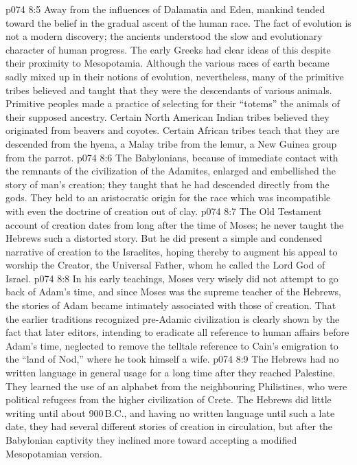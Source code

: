 \vs p074 8:5 Away from the influences of Dalamatia and Eden, mankind tended toward the belief in the gradual ascent of the human race. The fact of evolution is not a modern discovery; the ancients understood the slow and evolutionary character of human progress. The early Greeks had clear ideas of this despite their proximity to Mesopotamia. Although the various races of earth became sadly mixed up in their notions of evolution, nevertheless, many of the primitive tribes believed and taught that they were the descendants of various animals. Primitive peoples made a practice of selecting for their “totems” the animals of their supposed ancestry. Certain North American Indian tribes believed they originated from beavers and coyotes. Certain African tribes teach that they are descended from the hyena, a Malay tribe from the lemur, a New Guinea group from the parrot.
\vs p074 8:6 The Babylonians, because of immediate contact with the remnants of the civilization of the Adamites, enlarged and embellished the story of man’s creation; they taught that he had descended directly from the gods. They held to an aristocratic origin for the race which was incompatible with even the doctrine of creation out of clay.
\vs p074 8:7 \pc The Old Testament account of creation dates from long after the time of Moses; he never taught the Hebrews such a distorted story. But he did present a simple and condensed narrative of creation to the Israelites, hoping thereby to augment his appeal to worship the Creator, the Universal Father, whom he called the Lord God of Israel.
\vs p074 8:8 In his early teachings, Moses very wisely did not attempt to go back of Adam’s time, and since Moses was the supreme teacher of the Hebrews, the stories of Adam became intimately associated with those of creation. That the earlier traditions recognized pre\hyp{}Adamic civilization is clearly shown by the fact that later editors, intending to eradicate all reference to human affairs before Adam’s time, neglected to remove the telltale reference to Cain’s emigration to the “land of Nod,” where he took himself a wife.
\vs p074 8:9 The Hebrews had no written language in general usage for a long time after they reached Palestine. They learned the use of an alphabet from the neighbouring Philistines, who were political refugees from the higher civilization of Crete. The Hebrews did little writing until about 900\,B.C., and having no written language until such a late date, they had several different stories of creation in circulation, but after the Babylonian captivity they inclined more toward accepting a modified Mesopotamian version.
